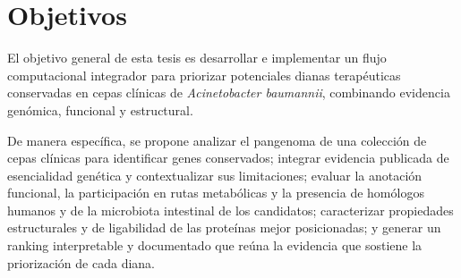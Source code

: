 \section{Objetivos}

El objetivo general de esta tesis es desarrollar e implementar un flujo computacional integrador para priorizar potenciales dianas terapéuticas conservadas en cepas clínicas de \textit{Acinetobacter baumannii}, combinando evidencia genómica, funcional y estructural.

De manera específica, se propone analizar el pangenoma de una colección de cepas clínicas para identificar genes conservados; integrar evidencia publicada de esencialidad genética y contextualizar sus limitaciones; evaluar la anotación funcional, la participación en rutas metabólicas y la presencia de homólogos humanos y de la microbiota intestinal de los candidatos; caracterizar propiedades estructurales y de ligabilidad de las proteínas mejor posicionadas; y generar un ranking interpretable y documentado que reúna la evidencia que sostiene la priorización de cada diana.
